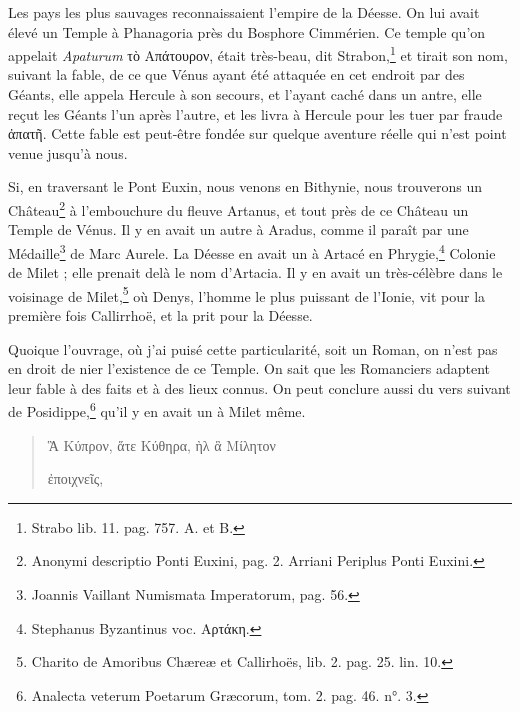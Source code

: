 \documentclass[a4paper, 18pt, oneside]{article}
\begin{document}
Les pays les plus sauvages reconnaissaient l'empire de la Déesse. On lui avait élevé un Temple à Phanagoria près du Bosphore Cimmérien. Ce temple qu'on appelait \emph{Apaturum} τὸ Απάτουρον, était très-beau, dit Strabon,\footnote{Strabo lib. 11. pag. 757. A. et B.} et tirait son nom, suivant la fable, de ce que Vénus ayant été attaquée en cet endroit par des Géants, elle appela Hercule à son secours, et l'ayant caché dans un antre, elle reçut les Géants l'un après l'autre, et les livra à Hercule pour les tuer par fraude ἀπατῆ. Cette fable est peut-être fondée sur quelque aventure réelle qui n'est point venue jusqu'à nous.

Si, en traversant le Pont Euxin, nous venons en Bithynie, nous trouverons un Château\footnote{Anonymi descriptio Ponti Euxini, pag. 2. Arriani Periplus Ponti Euxini.} à l'embouchure du fleuve Artanus, et tout près de ce Château un Temple de Vénus. Il y en avait un autre à Aradus, comme il paraît par une Médaille\footnote{Joannis Vaillant Numismata Imperatorum, pag. 56.} de Marc Aurele. La Déesse en avait un à Artacé en Phrygie,\footnote{Stephanus Byzantinus voc. Αρτάκη.} Colonie de Milet ; elle prenait delà le nom d'Artacia. Il y en avait un très-célèbre dans le voisinage de Milet,\footnote{Charito de Amoribus Chæreæ et Callirhoës, lib. 2. pag. 25. lin. 10.} où Denys, l'homme le plus puissant de l'Ionie, vit pour la première fois Callirrhoë, et la prit pour la Déesse.

Quoique l'ouvrage, où j'ai puisé cette particularité, soit un Roman, on n'est pas en droit de nier l'existence de ce Temple. On sait que les Romanciers adaptent leur fable à des faits et à des lieux connus. On peut conclure aussi du vers suivant de Posidippe,\footnote{Analecta veterum Poetarum Græcorum, tom. 2. pag. 46. n°. 3.} qu'il y en avait un à Milet même.
\begin{quotation}
Ἃ Κύπρον, ἅτε Κύθηρα, ὴλ ἃ Μίλητον

\hspace*{5mm}ἐποιχνεῖς,
\end{quotation}
\end{document}
